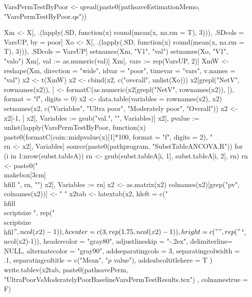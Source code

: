\begin{Schunk}
\begin{Sinput}
VarsPermTestByPoor <- qread(paste0(pathsaveEstimationMemo, "VarsPermTestByPoor.qs"))

Xm <- X[, .(lapply(.SD,  function(x) round(mean(x, na.rm = T), 3))), 
  .SDcols = VarsUP, by = poor] 
Xo <- X[, .(lapply(.SD,  function(x) round(mean(x, na.rm = T), 3))), 
  .SDcols = VarsUP] 
setnames(Xm, "V1", "val")
setnames(Xo, "V1", "valo")
Xm[, val := as.numeric(val)]
Xm[, vars := rep(VarsUP, 2)]
XmW <- reshape(Xm, direction  = "wide", idvar = "poor", 
  timevar = "vars", v.names = "val")
x2 <- t(XmW)
x2 <- cbind(x2, c("overall", unlist(Xo)))
x2[grepl("NetV", rownames(x2)), ] <- 
  formatC(as.numeric(x2[grepl("NetV", rownames(x2)), ]), format = "f", digits = 0)
x2 <- data.table(variables = rownames(x2), x2)
setnames(x2, c("Variables", "Ultra poor", "Moderately poor", "Overall"))
x2 <- x2[-1, ]
x2[, Variables := gsub("val.", "", Variables)]
x2[, pvalue := unlist(lapply(VarsPermTestByPoor, 
  function(x) paste0(formatC(coin::midpvalue(x)[1]*100, format = "f", digits = 2), "\\%
rn <- x2[, Variables]
source(paste0(pathprogram, "SubstTableANCOVA.R"))
for (i in 1:nrow(subst.tableA)) 
  rn <- gsub(subst.tableA[i, 1], subst.tableA[i, 2], rn)
rn <- paste0("\\makebox[3cm]{\\hfill ", rn, "}")
x2[, Variables := rn]
x2 <- as.matrix(x2)
colnames(x2)[grep("pv", colnames(x2))] <- " " 
x2tab <- latextab(x2, 
  hleft = c("\\hfill\\scriptsize ", rep("\\scriptsize\\hfil$", ncol(x2)-1)), 
  hcenter = c(3, rep(1.75, ncol(x2)-1)), 
  hright = c("", rep("$", ncol(x2)-1)), 
  headercolor = "gray80", adjustlineskip = "-.2ex", delimiterline= NULL,
  alternatecolor = "gray90",
  addseparatingcols = 3, 
  separatingcolwidth = .1,
  separatingcoltitle = c("Mean", "$p$ value"),
  addsubcoltitlehere = T
  )
write.tablev(x2tab,  
  paste0(pathsavePerm, "UltraPoorVsModeratelyPoorBaselineVarsPermTestResults.tex")
, colnamestrue = F)
\end{Sinput}
\end{Schunk}




